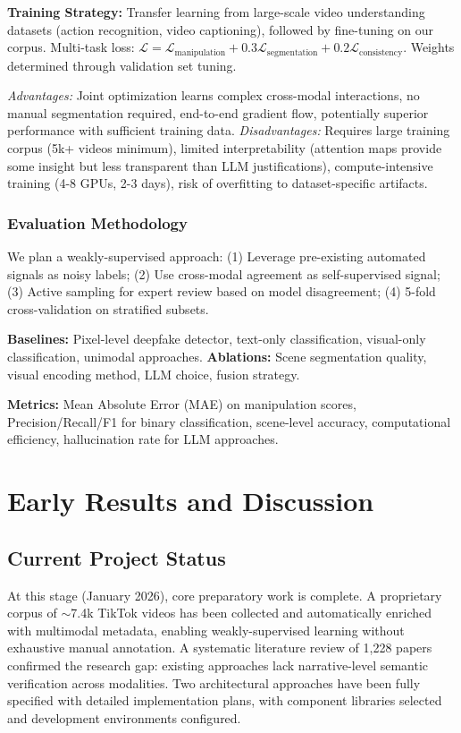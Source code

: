\documentclass[runningheads]{llncs}
\begin{document}
\textbf{Training Strategy:} Transfer learning from large-scale video understanding datasets (action recognition, video captioning), followed by fine-tuning on our corpus. Multi-task loss: $\mathcal{L} = \mathcal{L}_{\text{manipulation}} + 0.3\mathcal{L}_{\text{segmentation}} + 0.2\mathcal{L}_{\text{consistency}}$. Weights determined through validation set tuning.

\textit{Advantages:} Joint optimization learns complex cross-modal interactions, no manual segmentation required, end-to-end gradient flow, potentially superior performance with sufficient training data. \textit{Disadvantages:} Requires large training corpus (5k+ videos minimum), limited interpretability (attention maps provide some insight but less transparent than LLM justifications), compute-intensive training (4-8 GPUs, 2-3 days), risk of overfitting to dataset-specific artifacts.

\subsubsection{Evaluation Methodology}

We plan a weakly-supervised approach: (1) Leverage pre-existing automated signals as noisy labels; (2) Use cross-modal agreement as self-supervised signal; (3) Active sampling for expert review based on model disagreement; (4) 5-fold cross-validation on stratified subsets.

\textbf{Baselines:} Pixel-level deepfake detector, text-only classification, visual-only classification, unimodal approaches. \textbf{Ablations:} Scene segmentation quality, visual encoding method, LLM choice, fusion strategy.

\textbf{Metrics:} Mean Absolute Error (MAE) on manipulation scores, Precision/Recall/F1 for binary classification, scene-level accuracy, computational efficiency, hallucination rate for LLM approaches.

\section{Early Results and Discussion}

\subsection{Current Project Status}

At this stage (January 2026), core preparatory work is complete. A proprietary corpus of $\sim$7.4k TikTok videos has been collected and automatically enriched with multimodal metadata, enabling weakly-supervised learning without exhaustive manual annotation. A systematic literature review of 1,228 papers confirmed the research gap: existing approaches lack narrative-level semantic verification across modalities. Two architectural approaches have been fully specified with detailed implementation plans, with component libraries selected and development environments configured.
\end{document}
